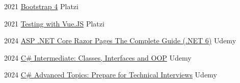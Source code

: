 \documentclass[letterpaper]{twentysecondcv} %
\begin{document}
{\begin{twenty}
        \twentyitem
        {2021}
        {\href{https://platzi.com/p/camurillo582/curso/1331-bootstrap/diploma/detalle/}
            {Bootstrap 4}
        }
        {Platzi}
        {}
        
        \twentyitem
        {2021}
        {\href{https://platzi.com/p/camurillo582/curso/1950-course/diploma/detalle/}
            {Testing with Vue.JS}
        }
        {Platzi}
        {}

        \twentyitem
        {2024}
        {\href{https://ude.my/UC-591f3b18-2bb5-405e-809f-f255c5c55927/}
            {ASP .NET Core Razor Pages The Complete Guide (.NET 6)}
        }
        {Udemy}
        {}

        \twentyitem
        {2024}
        {\href{https://ude.my/UC-f1dfcd3c-e4a3-4f3d-8ae6-9148a94ebebe/}
            {C\# Intermediate: Classes, Interfaces and OOP}
        }
        {Udemy}
        {}

        \twentyitem
        {2024}
        {\href{https://ude.my/UC-ecdfb40b-3f0d-44c4-ba49-7bfc833aa040/}
            { C\# Advanced Topics: Prepare for Technical Interviews}
        }
        {Udemy}
        {}         

\end{twenty}
}


 \restoregeometry
\end{document}
